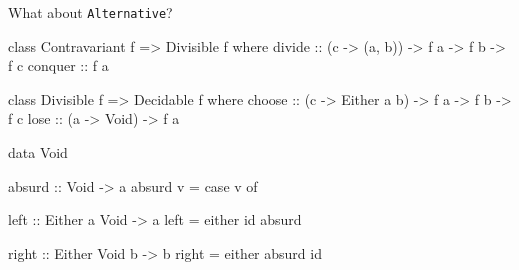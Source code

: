 \documentclass[UKenglish,usenames,dvipsnames,svgnames,table,aspectratio=169,mathserif]{beamer}
\newcommand{\nl}{\vspace{\baselineskip}}
\newcommand{\pnl}{\pause \nl}
\begin{document}
\begin{frame}
\centering
\huge What about {\tt Alternative}?
\end{frame}


\begin{frame}[fragile]
\begin{haskellcode}
class Contravariant f => Divisible f where
  divide  :: (c -> (a, b)) -> f a -> f b -> f c
  conquer :: f a
\end{haskellcode}
\pnl

\begin{haskellcode}
class Divisible f => Decidable f where
  choose :: (c -> Either a b) -> f a -> f b -> f c
  lose :: (a -> Void) -> f a
\end{haskellcode}

\end{frame}






\begin{frame}[fragile]
\begin{haskellcode}
data Void

absurd :: Void -> a
absurd v = case v of {}
\end{haskellcode}

\pnl

\begin{haskellcode}
left :: Either a Void -> a
left = either id absurd

right :: Either Void b -> b
right = either absurd id
\end{haskellcode}
\end{frame}
\end{document}
